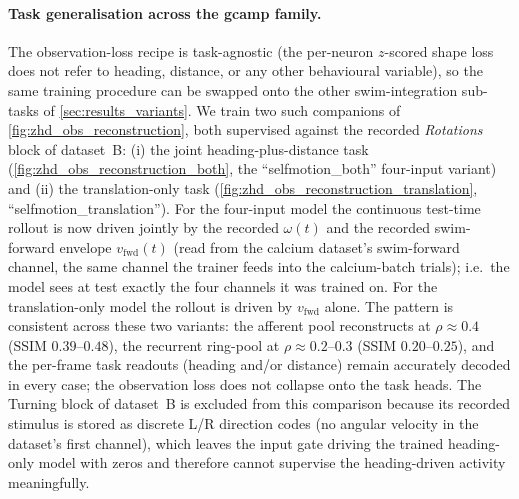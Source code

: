 \documentclass[11pt]{article}
\begin{document}
\paragraph{Task generalisation across the gcamp family.}
The observation-loss recipe is task-agnostic (the per-neuron
$z$-scored shape loss does not refer to heading, distance, or any
other behavioural variable), so the same training procedure can
be swapped onto the other swim-integration sub-tasks of
\cref{sec:results_variants}. We train two such companions of
\cref{fig:zhd_obs_reconstruction}, both supervised against the
recorded \emph{Rotations} block of dataset~B: (i) the joint
heading-plus-distance task (\cref{fig:zhd_obs_reconstruction_both},
the ``selfmotion\_both'' four-input variant) and (ii) the
translation-only task
(\cref{fig:zhd_obs_reconstruction_translation},
``selfmotion\_translation''). For the four-input model the
continuous test-time rollout is now driven jointly by the recorded
$\omega(t)$ and the recorded swim-forward envelope
$v_{\mathrm{fwd}}(t)$ (read from the calcium dataset's
swim-forward channel, the same channel the trainer feeds into the
calcium-batch trials); i.e.\ the model sees at test exactly the
four channels it was trained on. For the translation-only model
the rollout is driven by $v_{\mathrm{fwd}}$ alone. The pattern is
consistent across these two variants: the afferent pool
reconstructs at $\rho \approx 0.4$ (SSIM $0.39$--$0.48$), the
recurrent ring-pool at $\rho \approx 0.2$--$0.3$ (SSIM
$0.20$--$0.25$), and the per-frame task readouts (heading and/or
distance) remain accurately decoded in every case; the observation
loss does not collapse onto the task heads. The Turning block of
dataset~B is excluded from this comparison because its recorded
stimulus is stored as discrete L/R direction codes (no angular
velocity in the dataset's first channel), which leaves the input
gate driving the trained heading-only model with zeros and
therefore cannot supervise the heading-driven activity meaningfully.
\end{document}
